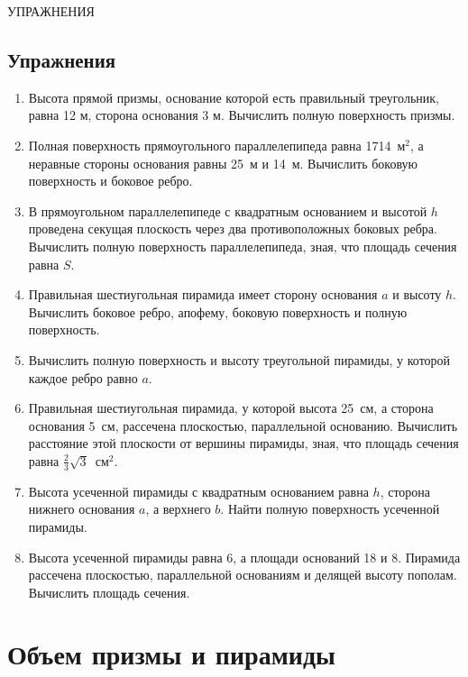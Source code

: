 \documentclass[twoside]{book}
\begin{document}
УПРАЖНЕНИЯ

\subsection*{Упражнения}



\begin{enumerate}

\item
Высота прямой призмы, основание которой есть правильный треугольник, равна 12 м, сторона основания 3 м.
Вычислить полную поверхность призмы.

\item
Полная поверхность прямоугольного параллелепипеда равна 1714~м$^2$, а неравные стороны основания равны 25~м и 14~м.
Вычислить боковую поверхность и боковое ребро.

\item
В прямоугольном параллелепипеде с квадратным основанием и высотой $h$ проведена секущая плоскость через два противоположных боковых ребра.
Вычислить полную поверхность параллелепипеда, зная, что площадь сечения равна $S$.

\item
Правильная шестиугольная пирамида имеет сторону основания $a$ и высоту $h$.
Вычислить боковое ребро, апофему, боковую поверхность и полную поверхность.

\item
Вычислить полную поверхность и высоту треугольной пирамиды, у которой каждое ребро равно $a$.

\item
Правильная шестиугольная пирамида, у которой высота 25~см, а сторона основания 5~см, рассечена плоскостью, параллельной основанию.
Вычислить расстояние этой плоскости от вершины пирамиды, зная, что площадь сечения равна $\tfrac23\sqrt{3}$~см$^2$.

\item
Высота усеченной пирамиды с квадратным основанием равна $h$, сторона нижнего основания $a$, а верхнего $b$.
Найти полную поверхность усеченной пирамиды.

\item
Высота усеченной пирамиды равна 6, а площади оснований 18 и 8.
Пирамида рассечена плоскостью, параллельной основаниям и делящей высоту пополам.
Вычислить площадь сечения.
\end{enumerate}

\section{Объем призмы и пирамиды}
\end{document}
